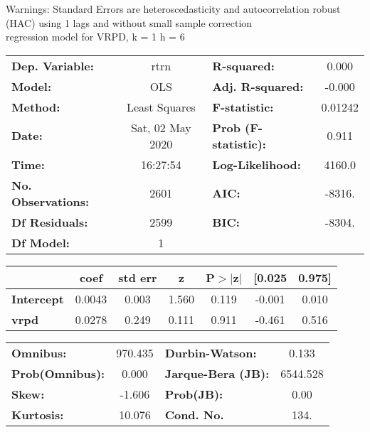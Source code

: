 Warnings: \newline
 [1] Standard Errors are heteroscedasticity and autocorrelation robust (HAC) using 1 lags and without small sample correction\\ 

regression model for VRPD, k = 1 h = 6\begin{center}
\begin{tabular}{lclc}
\toprule
\textbf{Dep. Variable:}    &       rtrn       & \textbf{  R-squared:         } &     0.000   \\
\textbf{Model:}            &       OLS        & \textbf{  Adj. R-squared:    } &    -0.000   \\
\textbf{Method:}           &  Least Squares   & \textbf{  F-statistic:       } &   0.01242   \\
\textbf{Date:}             & Sat, 02 May 2020 & \textbf{  Prob (F-statistic):} &    0.911    \\
\textbf{Time:}             &     16:27:54     & \textbf{  Log-Likelihood:    } &    4160.0   \\
\textbf{No. Observations:} &        2601      & \textbf{  AIC:               } &    -8316.   \\
\textbf{Df Residuals:}     &        2599      & \textbf{  BIC:               } &    -8304.   \\
\textbf{Df Model:}         &           1      & \textbf{                     } &             \\
\bottomrule
\end{tabular}
\begin{tabular}{lcccccc}
                   & \textbf{coef} & \textbf{std err} & \textbf{z} & \textbf{P$> |$z$|$} & \textbf{[0.025} & \textbf{0.975]}  \\
\midrule
\textbf{Intercept} &       0.0043  &        0.003     &     1.560  &         0.119        &       -0.001    &        0.010     \\
\textbf{vrpd}      &       0.0278  &        0.249     &     0.111  &         0.911        &       -0.461    &        0.516     \\
\bottomrule
\end{tabular}
\begin{tabular}{lclc}
\textbf{Omnibus:}       & 970.435 & \textbf{  Durbin-Watson:     } &    0.133  \\
\textbf{Prob(Omnibus):} &   0.000 & \textbf{  Jarque-Bera (JB):  } & 6544.528  \\
\textbf{Skew:}          &  -1.606 & \textbf{  Prob(JB):          } &     0.00  \\
\textbf{Kurtosis:}      &  10.076 & \textbf{  Cond. No.          } &     134.  \\
\bottomrule
\end{tabular}
\end{center}

